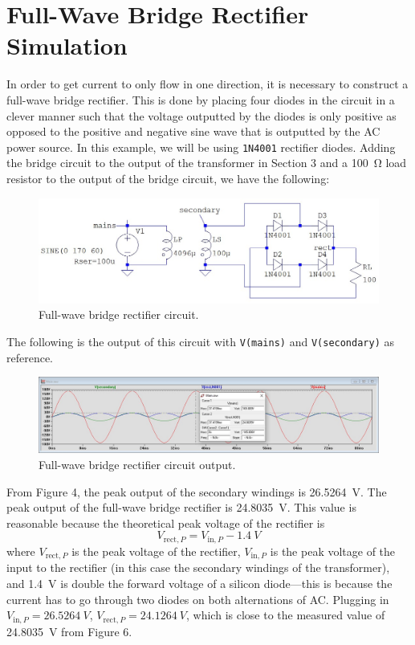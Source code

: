 \documentclass{article}
\begin{document}
\section{Full-Wave Bridge Rectifier Simulation} In order to
get current to only flow in one direction, it is necessary
to construct a full-wave bridge rectifier. This is done by
placing four diodes in the circuit in a clever manner such that
the voltage outputted by the diodes is only positive as opposed
to the positive and negative sine wave that is outputted by
the AC power source. In this example, we will be using
\texttt{1N4001} rectifier diodes. Adding the bridge circuit to
the output of the transformer in Section 3
and a \SI{100}{\ohm} load resistor to the output
of the bridge circuit, we have the following:

\begin{figure}[h]
    \centering
    \includegraphics[width=\textwidth]{Images/RectifierSchematic.jpg}
    \caption{Full-wave bridge rectifier circuit.}
    \label{fig5}
\end{figure}

The following is the output of this circuit with \texttt{V(mains)}
and \texttt{V(secondary)} as reference.

\begin{figure}[h]
    \centering
    \includegraphics[width=\textwidth]{Images/RectifierWaveform.jpg}
    \caption{Full-wave bridge rectifier circuit output.}
    \label{fig6}
\end{figure}

From Figure 4, the peak output of the secondary windings
is \SI{26.5264}{V}. The peak output of the full-wave bridge rectifier
is \SI{24.8035}{V}. This value is reasonable because the
theoretical peak voltage of the rectifier is
\begin{equation*}
V_{\text{rect},P}  = V_{\text{in},P} - \SI{1.4}{V}
\end{equation*}
where \(V_{\text{rect},P}\) is the peak voltage of the rectifier,
\(V_{\text{in},P}\) is the peak voltage of the input to the rectifier
(in this case the secondary windings of the transformer),
and \SI{1.4}{V} is double the forward voltage of a silicon
diode---this is because the current has to go through two diodes
on both alternations of AC. Plugging in
\( V_{\text{in},P} = \SI{26.5264}{V} \), \(V_{\text{rect},P} =
\SI{24.1264}{V}\), which is close to the measured value of
\SI{24.8035}{V} from Figure 6.
\end{document}
